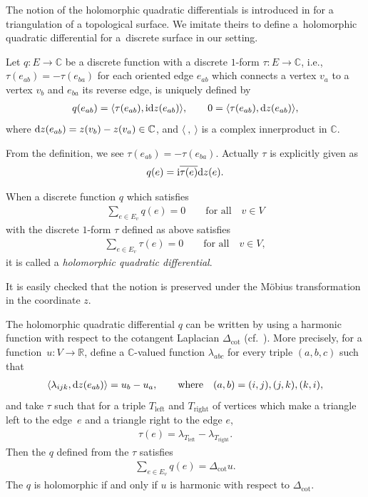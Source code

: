 \documentclass[pdftex]{sigma}
\newcommand{\R}{\mathbb{R}}
\newcommand{\C}{\mathbb{C}}
\newcommand{\ii}{{\mathrm{i}}}
\newcommand{\1}{{\bf 1}}
\newcommand{\nai}{\langle}
\newcommand{\seki}{\rangle}
\numberwithin{equation}{section}
\begin{document}
The notion of the holomorphic quadratic differentials is introduced in \cite{lam-pinkall} for a triangulation of a topological surface.
We imitate theirs to define a~holomorphic quadratic differential for a~discrete surface in our setting.

Let $q\colon E\to \C$ be a discrete function with a discrete $1$-form $\tau \colon E \to \C$,
i.e., $\tau(e_{ab}) = - \tau(e_{ba})$ for each oriented edge $e_{ab}$
which connects a vertex $v_a$ to a vertex $v_b$ and $e_{ba}$ its reverse edge, is uniquely defined by
\begin{gather*}
 q(e_{ab}) = \nai \tau(e_{ab}), \ii {\rm d}z(e_{ab}) \seki, \qquad
 0 = \nai \tau(e_{ab}), {\rm d}z(e_{ab}) \seki,
\end{gather*}
where ${\rm d}z(e_{ab}) = z(v_b)- z(v_a) \in \C$, and $\nai ~,~\seki$ is a complex innerproduct in $\C$.

From the definition, we see $\tau(e_{ab})= -\tau(e_{ba})$.
Actually $\tau$ is explicitly given as
\begin{gather*}
 q(e) = \ii \overline{\tau(e)}{\rm d}z(e).
\end{gather*}

\begin{Definition}
 When a discrete function $q$ which satisfies
 \begin{gather*}
 \sum_{e \in E_v} q(e)=0 \qquad \text{for all}\quad v \in V
 \end{gather*}
 with the discrete $1$-form $\tau$ defined as above satisfies
 \begin{gather*}
 \sum_{e \in E_v} \tau(e)=0 \qquad \text{for all}\quad v \in V,
 \end{gather*}
 it is called a {\em holomorphic quadratic differential}.
\end{Definition}
It is easily checked that the notion is preserved under the M\"obius transformation in the coordinate $z$.
\begin{Remark}
 The holomorphic quadratic differential $q$ can be written by using a harmonic function
 with respect to the cotangent Laplacian $\Delta_{\cot}$ (cf.\ \cite{pinkall-polthier}).
 More precisely, for a function~${u \colon V \to \R}$,
 define a $\C$-valued function $\lambda_{abc} $ for every triple $(a,b,c)$ such that
 \begin{gather*}
 \nai \lambda_{ijk}, {\rm d}z(e_{ab}) \seki = u_b -u_a, \qquad\text{where}\quad (a,b) = (i,j), (j,k),(k,i),
 \end{gather*}
 and take $\tau$ such that for a triple $T_{\mathrm{left}}$ and $T_{\mathrm{right}}$ of vertices
 which make a triangle left to the edge~$e$ and a triangle right to the edge $e$,
 \begin{gather*}
 \tau (e) = \lambda_{T_{\mathrm{left}}} -\lambda_{T_{\mathrm{right}}}.
 \end{gather*}
 Then the $q$ defined from the $\tau$ satisfies
 \begin{gather*}
 \sum_{e \in E_v} q(e) = \Delta_{\cot}u.
 \end{gather*}
 The $q$ is holomorphic if and only if $u$ is harmonic with respect to $\Delta_{\cot}$.
\end{Remark}
\end{document}
